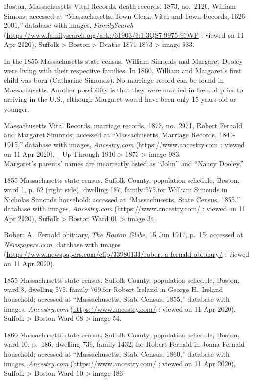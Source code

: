 \begin{thebibliography}{999}
	Boston, Massachusetts Vital Records, death records, 1873, no.\ 2126, William Simons; accessed at ``Massachusetts, Town Clerk, Vital and Town Records, 1626-2001,'' database with images, \textit{FamilySearch} (\url{https://www.familysearch.org/ark:/61903/3:1:3QS7-9975-96WP} : viewed on 11 Apr 2020), Suffolk > Boston > Deaths 1871-1873 > image 533.
	
	In the 1855 Massachusetts state census, William Simonds and Margaret Dooley were living with their respective families. In 1860, William and Margaret's first child was born (Catharine Simonds). No marriage record can be found in Massachusetts. Another possibility is that they were married in Ireland prior to arriving in the U.S., although Margaret would have been only 15 years old or younger.
	
	Massachusetts Vital Records, marriage records, 1873, no.\ 2971, Robert Fernald and Margaret Simonds; accessed at ``Massachusetts, Marriage Records, 1840-1915,'' database with images, \textit{Ancestry.com} (\url{https://www.ancestry.com} : viewed on 11 Apr 2020), \_Up Through 1910 > 1873 > image 983.\\
	Margaret's parents' names are incorrectly listed as ``John'' and ``Nancy Dooley.''
	
	1855 Massachusetts state census, Suffolk County, population schedule, Boston, ward 1, p. 62 (right side), dwelling 187, family 575,for William Simonds in Nicholas Simonds household; accessed at ``Massachusetts, State Census, 1855,'' database with images, \textit{Ancestry.com} (\url{https://www.ancestry.com/} : viewed on 11 Apr 2020), Suffolk > Boston Ward 01 > image 34.
	
	Robert A.\ Fernald obituary, \textit{The Boston Globe}, 15 Jun 1917, p.\ 15; accessed at \textit{Newspapers.com}, database with images (\url{https://www.newspapers.com/clip/33980133/robert-a-fernald-obituary/} : viewed on 11 Apr 2020).
	
	1855 Massachusetts state census, Suffolk County, population schedule, Boston, ward 8, dwelling 575, family 769,for Robert Ireland in George H.\ Ireland household; accessed at ``Massachusetts, State Census, 1855,'' database with images, \textit{Ancestry.com} (\url{https://www.ancestry.com/} : viewed on 11 Apr 2020), Suffolk > Boston Ward 08 > image 54.
	
	1860 Massachusetts state census, Suffolk County, population schedule, Boston, ward 10, p.\ 186, dwelling 739, family 1432, for Robert Fernald in Joana Fernald household; accessed at ``Massachusetts, State Census, 1860,'' database with images, \textit{Ancestry.com} (\url{https://www.ancestry.com/} : viewed on 11 Apr 2020), Suffolk > Boston Ward 10 > image 186
	

\end{thebibliography}
